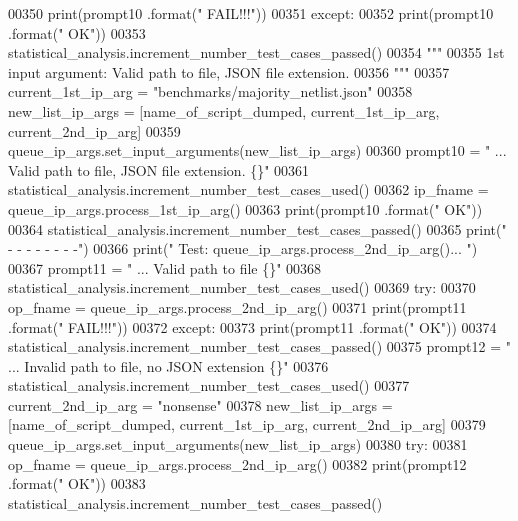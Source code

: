 \begin{DoxyCode}
00350             print(prompt10 .format(\textcolor{stringliteral}{"        FAIL!!!"}))
00351         \textcolor{keywordflow}{except}:
00352             print(prompt10 .format(\textcolor{stringliteral}{"    OK"}))
00353             statistical\_analysis.increment\_number\_test\_cases\_passed()
00354         \textcolor{stringliteral}{"""}
00355 \textcolor{stringliteral}{            1st input argument: Valid path to file, JSON file extension.}
00356 \textcolor{stringliteral}{        """}
00357         current\_1st\_ip\_arg = \textcolor{stringliteral}{"benchmarks/majority\_netlist.json"}
00358         new\_list\_ip\_args = [name\_of\_script\_dumped, current\_1st\_ip\_arg, current\_2nd\_ip\_arg]
00359         queue\_ip\_args.set\_input\_arguments(new\_list\_ip\_args)
00360         prompt10 = \textcolor{stringliteral}{"    ... Valid path to file, JSON file extension.    \{\}"}
00361         statistical\_analysis.increment\_number\_test\_cases\_used()
00362         ip\_fname = queue\_ip\_args.process\_1st\_ip\_arg()
00363         print(prompt10 .format(\textcolor{stringliteral}{"    OK"}))
00364         statistical\_analysis.increment\_number\_test\_cases\_passed()
00365         print(\textcolor{stringliteral}{" -   -   -   -   -   -   -   -"})
00366         print(\textcolor{stringliteral}{" Test: queue\_ip\_args.process\_2nd\_ip\_arg()... "})
00367         prompt11 = \textcolor{stringliteral}{"    ... Valid path to file  \{\}"}
00368         statistical\_analysis.increment\_number\_test\_cases\_used()
00369         \textcolor{keywordflow}{try}:
00370             op\_fname = queue\_ip\_args.process\_2nd\_ip\_arg()
00371             print(prompt11 .format(\textcolor{stringliteral}{"                FAIL!!!"}))
00372         \textcolor{keywordflow}{except}:
00373             print(prompt11 .format(\textcolor{stringliteral}{"                OK"}))
00374             statistical\_analysis.increment\_number\_test\_cases\_passed()
00375         prompt12 = \textcolor{stringliteral}{"    ... Invalid path to file, no JSON extension \{\}"}
00376         statistical\_analysis.increment\_number\_test\_cases\_used()
00377         current\_2nd\_ip\_arg = \textcolor{stringliteral}{"nonsense"}
00378         new\_list\_ip\_args = [name\_of\_script\_dumped, current\_1st\_ip\_arg, current\_2nd\_ip\_arg]
00379         queue\_ip\_args.set\_input\_arguments(new\_list\_ip\_args)
00380         \textcolor{keywordflow}{try}:
00381             op\_fname = queue\_ip\_args.process\_2nd\_ip\_arg()
00382             print(prompt12 .format(\textcolor{stringliteral}{"    OK"}))
00383             statistical\_analysis.increment\_number\_test\_cases\_passed()

\end{DoxyCode}
